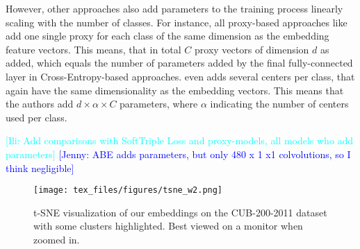 \documentclass{article}
\newcommand{\jenny}[1]{{\textcolor{blue}{[Jenny: #1]}}}
\newcommand{\ili}[1]{{\textcolor{cyan}{[Ili: #1]}}}
\begin{document}
However, other approaches also add parameters to the training process linearly scaling with the number of classes. For instance, all proxy-based approaches like \cite{DBLP:journals/corr/abs-2004-01113,DBLP:conf/cvpr/KimKCK20} add one single proxy for each class of the same dimension as the embedding feature vectors. This means, that in total $C$ proxy vectors of dimension $d$ as added, which equals the number of parameters added by the final fully-connected layer in Cross-Entropy-based approaches. 
\cite{DBLP:conf/iccv/QianSSHTLJ19} even adds several centers per class, that again have the same dimensionality as the embedding vectors. This means that the authors add $d \times \alpha \times C$ parameters, where $\alpha$ indicating the number of centers used per class.

\ili{Add comparisons with SoftTriple Loss and proxy-models, all models who add parameters} \jenny{ABE adds parameters, but only 480 x 1 x1 colvolutions, so I think negligible}
\fi



\begin{figure*}
    \begin{center}
    \centerline{\texttt{[image: tex\_files/figures/tsne\_w2.png]}}
    \caption{ t-SNE \cite{DBLP:journals/ml/MaatenH12} visualization of our  embeddings on the CUB-200-2011 \cite{WahCUB_200_2011} dataset with some clusters highlighted. Best viewed on a monitor when zoomed in.}
    \label{fig:tsne}
    \end{center}
\end{figure*}

\clearpage 
\clearpage


\end{document}
